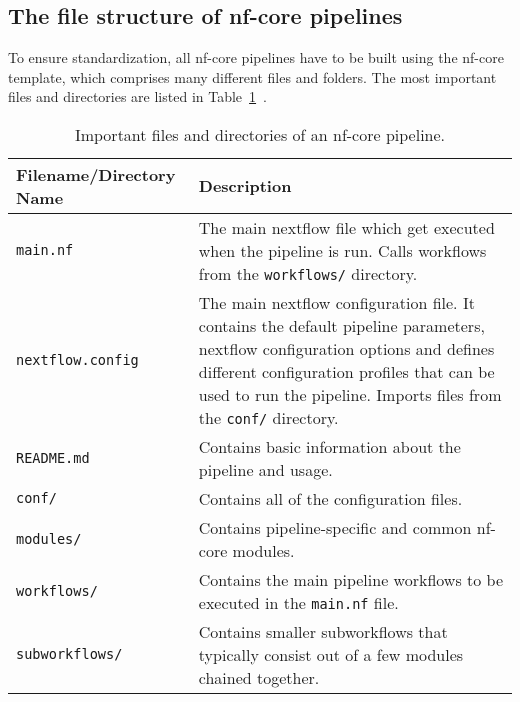\documentclass{article}
\theoremstyle{plain}
\theoremstyle{definition}
\theoremstyle{remark}
\begin{document}
\subsection{The file structure of nf-core pipelines}
To ensure standardization, all nf-core pipelines have to be built using the nf-core template, which comprises many different files and folders. The most important files and directories are listed in Table~\ref{nfcorefiles}~\cite{nfcorefs}.
\begin{table}[h]
    \centering
    \caption{Important files and directories of an nf-core pipeline.}
    \begin{tabular}{@{}lp{12cm}@{}}
        \toprule
        \textbf{Filename/Directory Name} & \textbf{Description} \\ \midrule
        \verb|main.nf| & The main nextflow file which get executed when the pipeline is run. Calls workflows from the \verb|workflows/| directory. \\
        \verb|nextflow.config| & The main nextflow configuration file. It contains the default pipeline parameters, nextflow configuration options and defines different configuration profiles that can be used to run the pipeline. Imports files from the \verb|conf/| directory. \\
        \verb|README.md| & Contains basic information about the pipeline and usage. \\
        \verb|conf/| & Contains all of the configuration files. \\
        \verb|modules/| & Contains pipeline-specific and common nf-core modules. \\
        \verb|workflows/| & Contains the main pipeline workflows to be executed in the \verb|main.nf| file. \\
        \verb|subworkflows/| & Contains smaller subworkflows that typically consist out of a few modules chained together. \\ \bottomrule
    \end{tabular}
    \label{nfcorefiles}
\end{table}
\end{document}
